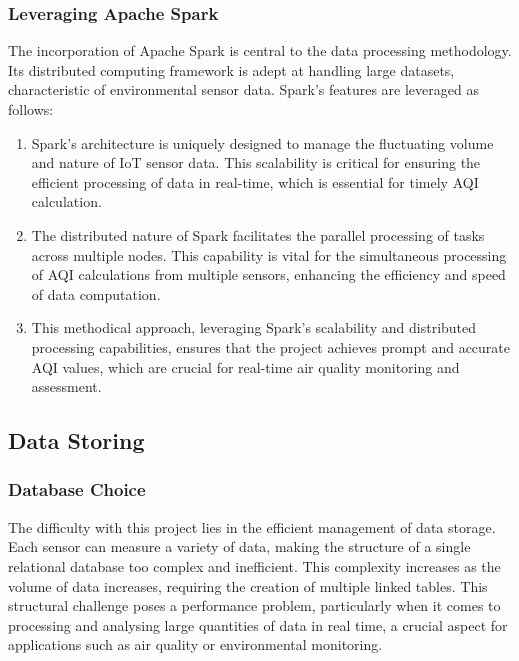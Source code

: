 \documentclass[12pt,oneside]{book} %
\begin{document}
\subsubsection{Leveraging Apache Spark}
The incorporation of Apache Spark is central to the data processing
methodology. Its distributed computing framework is adept at handling large
datasets, characteristic of environmental sensor data. Spark's features are
leveraged as follows:

\begin{enumerate}
    \item Spark's architecture is uniquely designed to manage the fluctuating volume and
          nature of IoT sensor data. This scalability is critical for ensuring the
          efficient processing of data in real-time, which is essential for timely AQI
          calculation.

    \item The distributed nature of Spark facilitates the parallel processing of tasks
          across multiple nodes. This capability is vital for the simultaneous processing
          of AQI calculations from multiple sensors, enhancing the efficiency and speed
          of data computation.

    \item This methodical approach, leveraging Spark's scalability and distributed
          processing capabilities, ensures that the project achieves prompt and accurate
          AQI values, which are crucial for real-time air quality monitoring and
          assessment.
\end{enumerate}

\subsection{Data Storing}

\subsubsection{Database Choice}
The difficulty with this project lies in the efficient management of data
storage. Each sensor can measure a variety of data, making the structure of a
single relational database too complex and inefficient. This complexity
increases as the volume of data increases, requiring the creation of multiple
linked tables. This structural challenge poses a performance problem,
particularly when it comes to processing and analysing large quantities of data
in real time, a crucial aspect for applications such as air quality or
environmental monitoring.
\end{document}
